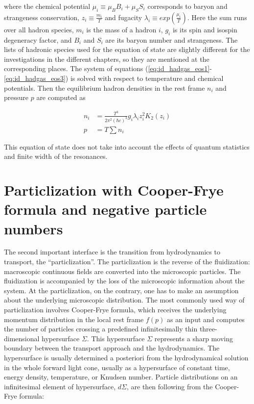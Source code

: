 where the chemical potential $\mu_i \equiv \mu_B B_i + \mu_S S_i$ corresponds
to baryon and strangeness conservation, $z_i \equiv \frac{m_i}{T}$ and fugacity
$\lambda_i \equiv exp \left( \frac{\mu_i}{T} \right)$. Here the sum runs over
all hadron species, $m_i$ is the mass of a hadron $i$, $g_i$ is its spin and
isospin degeneracy factor, and $B_i$ and $S_i$ are its baryon number and
strangeness. The lists of hadronic species used for the equation of state are
slightly different for the investigations in the different chapters, so they are
mentioned at the corresponding places. The system of equations
(\ref{eq:id_hadgas_eos1}-\ref{eq:id_hadgas_eos3}) is solved with respect to
temperature and chemical potentials.  Then the equilibrium hadron densities in
the rest frame $n_i$ and pressure $p$ are computed as

\begin{align} \label{eq:hadgas_ni}
  n_i &= \frac{T^3}{2\pi^2 (\hbar c)^3} g_i \lambda_i z_i^2 K_2(z_i) \\
  p &= T \sum n_i
\end{align}

This equation of state does not take into account the effects of quantum
statistics and finite width of the resonances.

\section{Particlization with Cooper-Frye formula and negative particle numbers}
\label{sec:cf_explanation}

The second important interface is the transition from hydrodynamics to transport,
the ``particlization''. The particlization is the reverse of the fluidization:
macroscopic continuous fields are converted into the microscopic particles. The
fluidization is accompanied by the loss of the microscopic information about the system.
At the particlization, on the contrary, one has to make an assumption about
the underlying microscopic distribution. The most commonly used way of particlization
involves Cooper-Frye formula, which receives the underlying momentum distribution in
the local rest frame $f(p)$ as an input and computes the number of particles crossing
a predefined infinitesimally thin three-dimensional hypersurface $\Sigma$. This
hypersurface $\Sigma$ represents a sharp moving boundary between the transport approach
and the hydrodynamics. The hypersurface is usually determined a posteriori from the
hydrodynamical solution in the whole forward light cone, usually as a hypersurface of
constant time, energy density, temperature, or Knudsen number. Particle distributions on
an infinitesimal element of hypersurface, $d\Sigma$, are then following from the Cooper-Frye formula:

